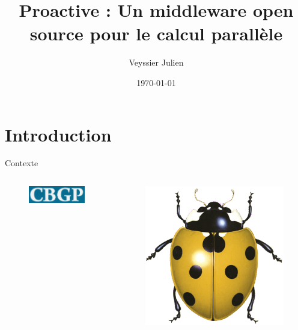 \documentclass[handout]{beamer}
\title{Proactive : Un middleware open source pour le calcul parallèle}
\author{Veyssier Julien}
\institute{CBGP - INRA}
\date\today
\begin{document}
\begin{frame}
\titlepage
\end{frame}

\begin{frame}
\tableofcontents
\end{frame}

\section[Introduction]{Introduction}
\begin{frame}
	\tableofcontents[currentsection]
\end{frame}

\begin{frame}{Contexte}
	\begin{columns}
	\begin{column}[l]{0.5\linewidth}
        \begin{columns}
        \begin{column}[l]{0.5\linewidth}
        \begin{figure}
            \centering
            \includegraphics[scale=0.32]{cbgp.png}
        \end{figure}
        \end{column}
        \begin{column}[r]{0.5\linewidth}
        \begin{figure}
            \centering
            \includegraphics[scale=0.32]{cocci.png}

\end{figure}
\end{column}
\end{columns}
\end{column}
\end{columns}
\end{frame}
\end{document}

